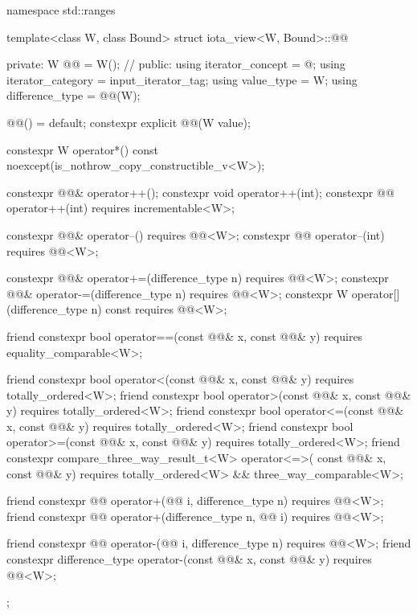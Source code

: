 %
\begin{codeblock}
namespace std::ranges {
  template<class W, class Bound>
  struct iota_view<W, Bound>::@@ {
  private:
    W @@ = W();             // \expos
  public:
    using iterator_concept = @\seebelow@;
    using iterator_category = input_iterator_tag;
    using value_type = W;
    using difference_type = @@(W);

    @@() = default;
    constexpr explicit @@(W value);

    constexpr W operator*() const noexcept(is_nothrow_copy_constructible_v<W>);

    constexpr @@& operator++();
    constexpr void operator++(int);
    constexpr @@ operator++(int) requires incrementable<W>;

    constexpr @@& operator--() requires @@<W>;
    constexpr @@ operator--(int) requires @@<W>;

    constexpr @@& operator+=(difference_type n)
      requires @@<W>;
    constexpr @@& operator-=(difference_type n)
      requires @@<W>;
    constexpr W operator[](difference_type n) const
      requires @@<W>;

    friend constexpr bool operator==(const @@& x, const @@& y)
      requires equality_comparable<W>;

    friend constexpr bool operator<(const @@& x, const @@& y)
      requires totally_ordered<W>;
    friend constexpr bool operator>(const @@& x, const @@& y)
      requires totally_ordered<W>;
    friend constexpr bool operator<=(const @@& x, const @@& y)
      requires totally_ordered<W>;
    friend constexpr bool operator>=(const @@& x, const @@& y)
      requires totally_ordered<W>;
    friend constexpr compare_three_way_result_t<W> operator<=>(
        const @@& x, const @@& y)
      requires totally_ordered<W> && three_way_comparable<W>;

    friend constexpr @@ operator+(@@ i, difference_type n)
      requires @@<W>;
    friend constexpr @@ operator+(difference_type n, @@ i)
      requires @@<W>;

    friend constexpr @@ operator-(@@ i, difference_type n)
      requires @@<W>;
    friend constexpr difference_type operator-(const @@& x, const @@& y)
      requires @@<W>;
  };
}
\end{codeblock}

